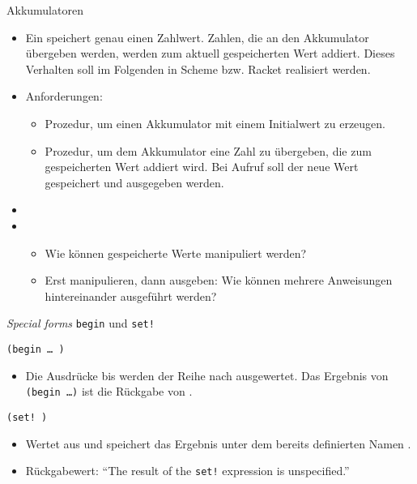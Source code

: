 \begin{frame}[t]{Akkumulatoren}
	\begin{itemize}
		\item Ein  speichert genau einen Zahlwert.
		Zahlen, die an den Akkumulator übergeben werden, werden zum aktuell gespeicherten Wert addiert.
		Dieses Verhalten soll im Folgenden in Scheme bzw. Racket realisiert werden. \pause
		\item Anforderungen:
		\begin{itemize}
			\item Prozedur, um einen Akkumulator mit einem Initialwert zu erzeugen.
			\item Prozedur, um dem Akkumulator eine Zahl zu übergeben, die zum gespeicherten Wert addiert wird.
			Bei Aufruf soll der neue Wert gespeichert und ausgegeben werden. \pause
		\end{itemize}
		\item[]
		\item {}
		\begin{itemize}
			\item Wie können gespeicherte Werte manipuliert werden?
			\item Erst manipulieren, dann ausgeben: Wie können mehrere Anweisungen hintereinander ausgeführt werden?
		\end{itemize}
	\end{itemize}
\end{frame}

\begin{frame}[t,fragile]{\textit{Special forms} \texttt{begin} und \texttt{set!}}
	\begin{center}
		\texttt{(begin   \dots \ )}
	\end{center}
	\begin{itemize}
		\item Die Ausdrücke  bis  werden der Reihe nach ausgewertet.
			Das Ergebnis von \texttt{(begin~\dots)} ist die Rückgabe von . \pause
	\end{itemize}
		\begin{center}
			\texttt{(set!  )}
		\end{center}
	\begin{itemize}
		\item Wertet  aus und speichert das Ergebnis unter dem bereits definierten Namen . \pause
		\item Rückgabewert: \enquote{The result of the \texttt{set!} expression is unspecified.} 
	\end{itemize}
\end{frame}

